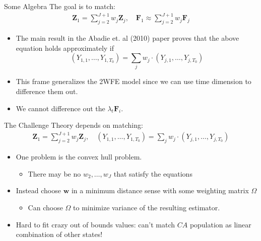 \documentclass[xcolor=pdftex,dvipsnames,table,mathserif,aspectratio=169]{beamer}
\begin{document}
\begin{frame}{Some Algebra}
The goal is to match:
\begin{align*}
\mathbf{Z}_{1}= \sum_{j=2}^{J+1} w_{j} \mathbf{Z}_{j}, \quad
\mathbf{F}_{1} \approx \sum_{j=2}^{J+1} w_{j} \mathbf{F}_{j} 
\end{align*}
\begin{itemize}
\item The main result in the Abadie et. al (2010) paper proves that the above equation holds approximately if 
$$\left({Y_{1,1},\ldots, Y_{1,T_0}} \right)= \sum_j w_j \cdot \left({Y_{j,1},\ldots, Y_{j,T_0}} \right)$$
\item This frame generalizes the 2WFE model since we can use time dimension to difference them out.
\item We cannot difference out the $\lambda_t \mathbf{F}_i$.
\end{itemize}
\end{frame}


\begin{frame}{The Challenge}
Theory depends on matching:
\begin{align*}
\mathbf{Z}_{1}= \sum_{j=2}^{J+1} w_{j} \mathbf{Z}_{j}, \quad
\left({Y_{1,1},\ldots, Y_{1,T_0}} \right)= \sum_j w_j \cdot \left({Y_{j,1},\ldots, Y_{j,T_0}} \right)
\end{align*}
\begin{itemize}
\item One problem is the \alert{convex hull} problem. 
\begin{itemize}
\item There may be no $w_2,\ldots,w_J$ that satisfy the equations 
\end{itemize}
\item Instead choose $\mathbf{w}$ in a \alert{minimum distance sense} with some weighting matrix $\Omega$
\begin{itemize}
\item Can choose $\Omega$ to minimize variance of the resulting estimator.
\end{itemize}
\item Hard to fit crazy out of bounds values: can't match $CA$ population as linear combination of other states!
\end{itemize}
\end{frame}
\end{document}
